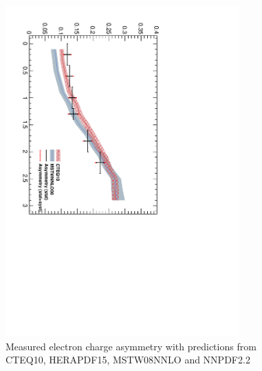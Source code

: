 \begin{figure}[htb]
  \begin{center}
\includegraphics*[width=0.80\textwidth]{Asym_35}
  \caption{\label{fig:asym35} Measured electron charge asymmetry with predictions from CTEQ10, HERAPDF15, MSTW08NNLO and NNPDF2.2}
  \end{center}
\end{figure}

